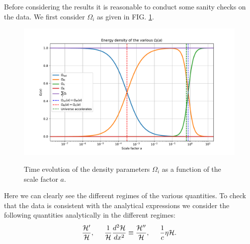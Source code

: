 \documentclass[%
reprint,
 amsmath,amssymb,
 aps,
]{revtex4-2}
\newcommand{\Hp}{\mathcal{H}}
\begin{document}
Before considering the results it is reasonable to conduct some sanity checks on the data. We first consider $\Omega_i$ as given in FIG. \ref{fig:Omegai}.
\begin{figure}[ht!]
	\caption{Time evolution of the density parameters $\Omega_i$ as a function of the scale factor $a$.}
	\includegraphics[width = \linewidth]{Figures/Omega_i.pdf}
	\label{fig:Omegai}
\end{figure}
Here we can clearly see the different regimes of the various quantities. To check that the data is consistent with the analytical expressions we consider the following quantities analytically in the different regimes:
\[\frac{\Hp'}{\Hp},\hspace{5mm}\frac{1}{\Hp}\frac{d^2\Hp}{dx^2}\equiv\frac{\Hp''}{\Hp},\hspace{5mm}\frac{1}{c}\eta\Hp.\]
\end{document}
